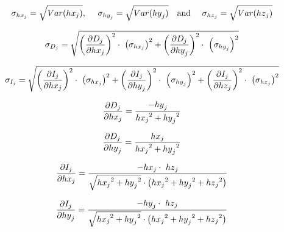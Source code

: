 \documentclass[manuscript,revised]{geophysics}
\begin{document}

\begin{equation} \label{eq:sphere20}
\centering
\sigma_{{hx}_j}=\sqrt{Var({hx}_j)},\ \ \ \  \sigma_{{hy}_j}=\sqrt{Var({hy}_j)}\ \ \ \text{and}\ \ \ \  \sigma_{{hz}_j}=\sqrt{Var({hz}_j)}
\end{equation}


\begin{equation} \label{eq:sphere21}
\centering
\sigma_{D_j}=\sqrt{\left(\frac{\partial D_j}{\partial{hx}_j}\right)^2\cdot\ \left(\sigma_{{hx}_j}\right)^2+\left(\frac{\partial D_j}{\partial{hy}_j}\right)^2\cdot\ \left(\sigma_{{hy}_j}\right)^2}
\end{equation}

\begin{equation} \label{eq:sphere22}
\centering
\sigma_{I_j}=\sqrt{\left(\frac{\partial I_j}{\partial{hx}_j}\right)^2\cdot\ \left(\sigma_{{hx}_j}\right)^2+\left(\frac{\partial I_j}{\partial{hy}_j}\right)^2\cdot\ \left(\sigma_{{hy}_j}\right)^2+\left(\frac{\partial I_j}{\partial{hz}_j}\right)^2\cdot\ \left(\sigma_{{hz}_j}\right)^2}
\end{equation}


\begin{equation} \label{eq:sphere23}
\centering
\frac{\partial D_j}{\partial{hx}_j}=\frac{-{hy}_j}{{{hx}_j}^2+{{hy}_j}^2}
\end{equation}

\begin{equation} \label{eq:sphere24}
\centering
\frac{\partial D_j}{\partial{hy}_j}=\frac{{hx}_j}{{{hx}_j}^2+{{hy}_j}^2}
\end{equation}

\begin{equation} \label{eq:sphere25}
\centering
\frac{\partial I_j}{\partial{hx}_j}=\frac{-{hx}_j\cdot \ {hz}_j}{\sqrt{{{hx}_j}^2+{{hy}_j}^2}\cdot \left({{hx}_j}^2+{{hy}_j}^2+{{hz}_j}^2\right)}
\end{equation}

\begin{equation} \label{eq:sphere26}
\centering
\frac{\partial I_j}{\partial{hy}_j}=\frac{-{hy}_j\cdot \ {hz}_j}{\sqrt{{{hx}_j}^2+{{hy}_j}^2}\cdot \left({{hx}_j}^2+{{hy}_j}^2+{{hz}_j}^2\right)}
\end{equation}
\end{document}

